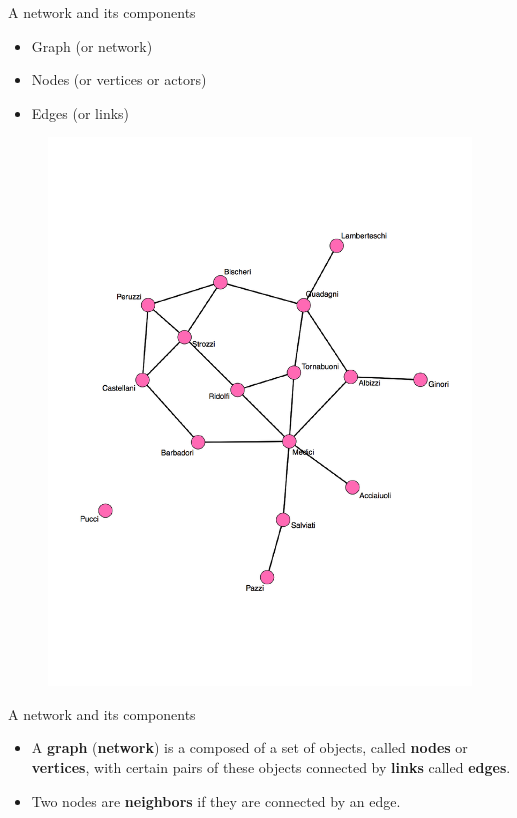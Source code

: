 \documentclass[10pt]{beamer}
\begin{document}
\begin{frame}{A network and its components}

	\begin{itemize}
		\item Graph (or network)
		\item Nodes (or vertices or actors)
		\item Edges (or links)
	\end{itemize}
\end{frame}

\begin{frame}
	\begin{figure}
	\centering
	\includegraphics[scale=0.37]{Figs/marriage}
	\end{figure}
\end{frame}

\begin{frame}{A network and its components}
	\begin{itemize}
		\item A \textbf{graph} (\textbf{network}) is a composed of a set of objects, called \textbf{nodes} or \textbf{vertices}, with certain pairs of these objects connected by \textbf{links} called \textbf{edges}.
		
		\item Two nodes are \textbf{neighbors} if they are connected by an edge.
	\end{itemize}
\end{frame}
\end{document}
